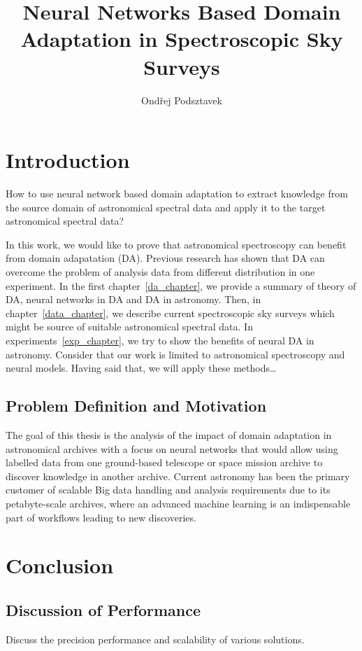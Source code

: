 \documentclass[thesis=M,english]{FITthesis}[2012/10/20]
\title{Neural Networks Based Domain Adaptation in Spectroscopic Sky Surveys}
\author{Ondřej Podsztavek}
\theoremstyle{definition}
\begin{document}
\chapter{Introduction}

How to use neural network based domain adaptation to extract knowledge from the source domain of astronomical spectral data
and apply it to the target astronomical spectral data?

In this work, we would like to prove that astronomical spectroscopy can benefit from domain adapatation (DA).
Previous research has shown that DA can overcome the problem of analysis data from different distribution in one experiment.
In the first chapter~\ref{da_chapter}, we provide a summary of theory of DA, neural networks in DA and DA in astronomy.
Then, in chapter~\ref{data_chapter}, we describe current spectroscopic sky surveys
which might be source of suitable astronomical spectral data.
In experiments~\ref{exp_chapter}, we try to show the benefits of neural DA in astronomy.
Consider that our work is limited to astronomical spectroscopy and neural models.
Having said that, we will apply these methods\dots{}

\section{Problem Definition and Motivation}

The goal of this thesis is the analysis of the impact of domain adaptation in astronomical archives with a focus on neural networks
that would allow using labelled data from one ground-based telescope or space mission archive to discover knowledge in another archive.
Current astronomy has been the primary customer of scalable Big data handling and analysis requirements due to its petabyte-scale archives,
where an advanced machine learning is an indispensable part of workflows leading to new discoveries.





\chapter{Conclusion}

\section{Discussion of Performance}

Discuss the precision performance and scalability of various solutions.
\end{document}
